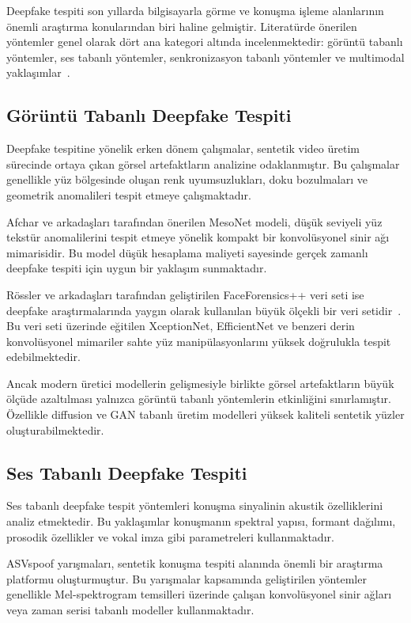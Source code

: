 \documentclass[conference]{IEEEtran}
\begin{document}
Deepfake tespiti son yıllarda bilgisayarla görme ve konuşma işleme alanlarının önemli araştırma konularından biri haline gelmiştir. Literatürde önerilen yöntemler genel olarak dört ana kategori altında incelenmektedir: görüntü tabanlı yöntemler, ses tabanlı yöntemler, senkronizasyon tabanlı yöntemler ve multimodal yaklaşımlar~\cite{tolosana2020deepfakes}.

\subsection{Görüntü Tabanlı Deepfake Tespiti}

Deepfake tespitine yönelik erken dönem çalışmalar, sentetik video üretim sürecinde ortaya çıkan görsel artefaktların analizine odaklanmıştır. Bu çalışmalar genellikle yüz bölgesinde oluşan renk uyumsuzlukları, doku bozulmaları ve geometrik anomalileri tespit etmeye çalışmaktadır.

Afchar ve arkadaşları tarafından önerilen MesoNet modeli, düşük seviyeli yüz tekstür anomalilerini tespit etmeye yönelik kompakt bir konvolüsyonel sinir ağı mimarisidir. Bu model düşük hesaplama maliyeti sayesinde gerçek zamanlı deepfake tespiti için uygun bir yaklaşım sunmaktadır.

Rössler ve arkadaşları tarafından geliştirilen FaceForensics++ veri seti ise deepfake araştırmalarında yaygın olarak kullanılan büyük ölçekli bir veri setidir~\cite{rossler2019faceforensics}. Bu veri seti üzerinde eğitilen XceptionNet, EfficientNet ve benzeri derin konvolüsyonel mimariler sahte yüz manipülasyonlarını yüksek doğrulukla tespit edebilmektedir.

Ancak modern üretici modellerin gelişmesiyle birlikte görsel artefaktların büyük ölçüde azaltılması yalnızca görüntü tabanlı yöntemlerin etkinliğini sınırlamıştır. Özellikle diffusion ve GAN tabanlı üretim modelleri yüksek kaliteli sentetik yüzler oluşturabilmektedir.

\subsection{Ses Tabanlı Deepfake Tespiti}

Ses tabanlı deepfake tespit yöntemleri konuşma sinyalinin akustik özelliklerini analiz etmektedir. Bu yaklaşımlar konuşmanın spektral yapısı, formant dağılımı, prosodik özellikler ve vokal imza gibi parametreleri kullanmaktadır.

ASVspoof yarışmaları, sentetik konuşma tespiti alanında önemli bir araştırma platformu oluşturmuştur. Bu yarışmalar kapsamında geliştirilen yöntemler genellikle Mel-spektrogram temsilleri üzerinde çalışan konvolüsyonel sinir ağları veya zaman serisi tabanlı modeller kullanmaktadır.
\end{document}
